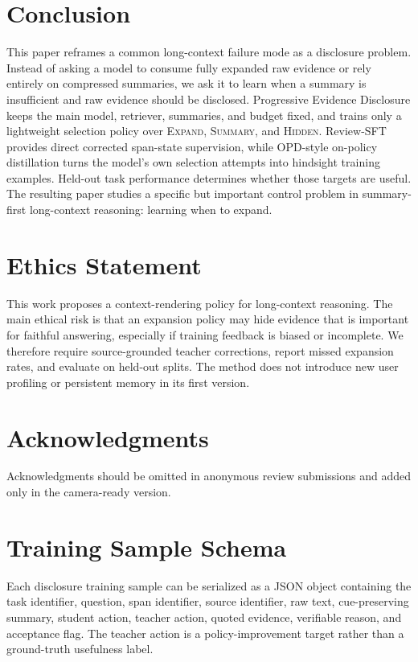 \documentclass[11pt]{article}
\newcommand{\method}{Progressive Evidence Disclosure}
\newcommand{\expandact}{\textsc{Expand}}
\newcommand{\summaryact}{\textsc{Summary}}
\newcommand{\hiddenact}{\textsc{Hidden}}
\begin{document}
\section{Conclusion}

This paper reframes a common long-context failure mode as a disclosure problem. Instead of asking a model to consume fully expanded raw evidence or rely entirely on compressed summaries, we ask it to learn when a summary is insufficient and raw evidence should be disclosed. \method{} keeps the main model, retriever, summaries, and budget fixed, and trains only a lightweight selection policy over \expandact{}, \summaryact{}, and \hiddenact{}. Review-SFT provides direct corrected span-state supervision, while OPD-style on-policy distillation turns the model's own selection attempts into hindsight training examples. Held-out task performance determines whether those targets are useful. The resulting paper studies a specific but important control problem in summary-first long-context reasoning: learning when to expand.

\section*{Ethics Statement}

This work proposes a context-rendering policy for long-context reasoning. The main ethical risk is that an expansion policy may hide evidence that is important for faithful answering, especially if training feedback is biased or incomplete. We therefore require source-grounded teacher corrections, report missed expansion rates, and evaluate on held-out splits. The method does not introduce new user profiling or persistent memory in its first version.

\section*{Acknowledgments}

Acknowledgments should be omitted in anonymous review submissions and added only in the camera-ready version.




\appendix

\section{Training Sample Schema}

Each disclosure training sample can be serialized as a JSON object containing the task identifier, question, span identifier, source identifier, raw text, cue-preserving summary, student action, teacher action, quoted evidence, verifiable reason, and acceptance flag. The teacher action is a policy-improvement target rather than a ground-truth usefulness label.
\end{document}

